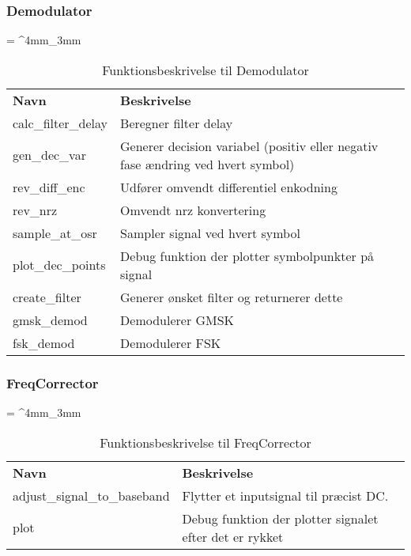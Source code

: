 \begin{appendices}
\subsubsection{Demodulator}
\begin{table}[H]
	\renewcommand{\arraystretch}{2}
	\centering
	\sffamily
	\tabulinesep = ^4mm_3mm
	\begin{tabu}{ m{4cm}  m{8.5cm} }
		\color{white}\bfseries Navn &\color{white}\bfseries Beskrivelse \\
		calc\_filter\_delay & Beregner filter delay\\
		gen\_dec\_var 		& Generer decision variabel (positiv eller negativ fase ændring ved hvert symbol) \\
		rev\_diff\_enc 		& Udfører omvendt differentiel enkodning  \\
		rev\_nrz 			& Omvendt nrz konvertering \\
		sample\_at\_osr 	& Sampler signal ved hvert symbol\\
		plot\_dec\_points 	& Debug funktion der plotter symbolpunkter på signal \\
		create\_filter 		& Generer ønsket filter og returnerer dette \\
		gmsk\_demod 		& Demodulerer GMSK \\
		fsk\_demod 			& Demodulerer FSK \\
	\end{tabu}
	\caption{Funktionsbeskrivelse til Demodulator}
	\label{tab:func_descr_Demodulator}
\end{table}

\subsubsection{FreqCorrector}
\begin{table}[H]
	\renewcommand{\arraystretch}{2}
	\centering
	\sffamily
	\tabulinesep = ^4mm_3mm
	\begin{tabu}{ m{4cm}  m{8.5cm} }
		\color{white}\bfseries Navn &\color{white}\bfseries Beskrivelse \\
		adjust\_signal\_to\_baseband & Flytter et inputsignal til præcist DC. \\
		plot & Debug funktion der plotter signalet efter det er rykket  \\
	\end{tabu}
	\caption{Funktionsbeskrivelse til FreqCorrector}
	\label{tab:func_descr_FreqCorrector}
\end{table}
\pagebreak 


\end{appendices}
